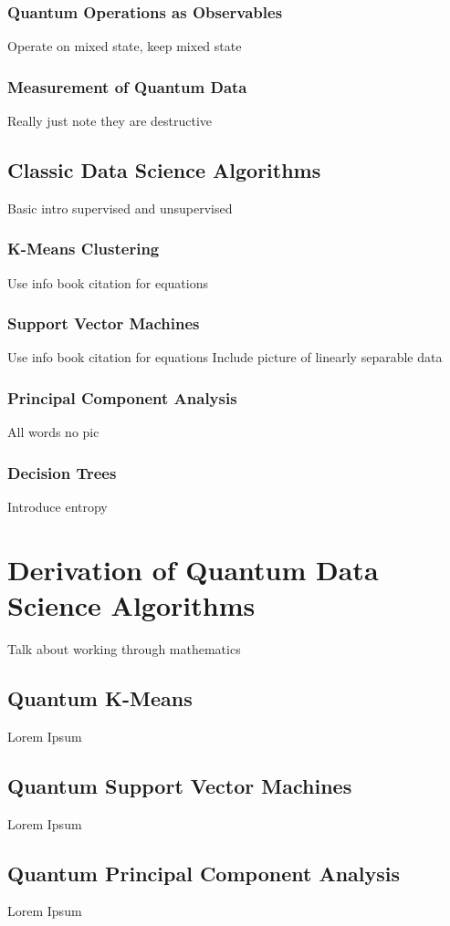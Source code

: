 \documentclass[conference]{IEEEtran}
\begin{document}
\subsubsection{Quantum Operations as Observables}
Operate on mixed state, keep mixed state
\subsubsection{Measurement of Quantum Data}
Really just note they are destructive 

\subsection{Classic Data Science Algorithms}
Basic intro supervised and unsupervised 
\subsubsection{K-Means Clustering}
Use info book citation for equations
\subsubsection{Support Vector Machines}
Use info book citation for equations
Include picture of linearly separable data
\subsubsection{Principal Component Analysis}
All words no pic
\subsubsection{Decision Trees}
Introduce entropy 



\section{Derivation of Quantum Data Science Algorithms}
Talk about working through mathematics
\subsection{Quantum K-Means}
Lorem Ipsum
\subsection{Quantum Support Vector Machines}
Lorem Ipsum
\subsection{Quantum Principal Component Analysis}
Lorem Ipsum
\end{document}
